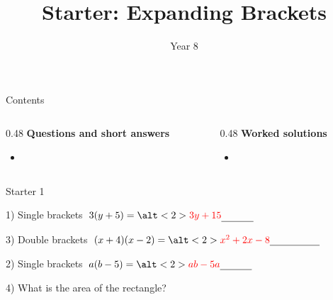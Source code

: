 \documentclass{beamer}
\title{Starter: Expanding Brackets}
\author{Year 8}
\date{}
\newcommand{\ablank}[1]{%
  \alt<2>{\textcolor{red}{#1}}{\underline{\phantom{#1}}}%
}
\newcommand{\ashow}[1]{\uncover<2->{\textcolor{red}{\small #1}}}
\newcommand{\ashowq}[1]{\alt<2->{\textcolor{red}{\small #1}}{?}}
\begin{document}
\frame{\titlepage}

\begin{frame}{Contents}
\small
\begin{columns}[T]
  \begin{column}{0.48\textwidth}
    \textbf{Questions and short answers}
    \begin{itemize}
      \item \hyperlink{q-st1}{}
    \end{itemize}
  \end{column}
  \begin{column}{0.48\textwidth}
    \textbf{Worked solutions}
    \begin{itemize}
      \item \hyperlink{work-st1}{}
    \end{itemize}
  \end{column}
\end{columns}
\end{frame}

\begin{frame}{Starter 1}
\hypertarget{q-st1}{}
\begin{minipage}[t]{0.48\textwidth}
  \begin{block}{1) Single brackets}
    \Large \(\;3(y+5)=\ablank{3y+15}\)
  \end{block}
  \vspace{0.5em}
  \begin{block}{3) Double brackets}
    \Large \(\;(x+4)(x-2)=\ablank{x^2+2x-8}\)
  \end{block}
\end{minipage}\hfill
\begin{minipage}[t]{0.48\textwidth}
  \begin{block}{2) Single brackets}
    \Large \(\; a(b-5)=\ablank{ab-5a}\)
  \end{block}
  \vspace{0.5em}
  \begin{block}{4) What is the area of the rectangle?}
    \par\vspace{0.5em}
    \ashow{Area = \(x(f+6)\)}
  \end{block}
\end{minipage}
\end{frame}
\end{document}
